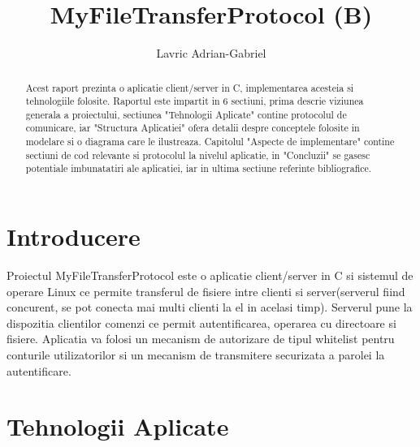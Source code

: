 \documentclass[runningheads]{llncs}
\begin{document}
%
\title{MyFileTransferProtocol (B)}
%
%
\author{Lavric Adrian-Gabriel} 
%
%
%
\maketitle              %
%
\begin{abstract}

Acest raport prezinta o aplicatie client/server in C, implementarea acesteia si tehnologiile folosite. Raportul este impartit in 6 sectiuni, prima descrie viziunea generala a proiectului, sectiunea "Tehnologii Aplicate" contine protocolul de comunicare, iar "Structura Aplicatiei" ofera detalii despre conceptele folosite in modelare si o diagrama care le ilustreaza. Capitolul "Aspecte de implementare" contine sectiuni de cod relevante si protocolul la nivelul aplicatie, in "Concluzii" se gasesc potentiale imbunatatiri ale aplicatiei, iar in ultima sectiune referinte bibliografice.


\end{abstract}
%
%
%
\section{Introducere}

Proiectul MyFileTransferProtocol este o aplicatie client/server in C si sistemul de operare Linux ce permite transferul de fisiere intre clienti si server(serverul fiind concurent, se pot conecta mai multi clienti la el in acelasi timp). Serverul pune la dispozitia clientilor comenzi ce permit autentificarea, operarea cu directoare si fisiere. Aplicatia va folosi un mecanism de autorizare de tipul whitelist pentru conturile utilizatorilor si un mecanism de transmitere securizata a parolei la autentificare.

\section{Tehnologii Aplicate}
\end{document}
